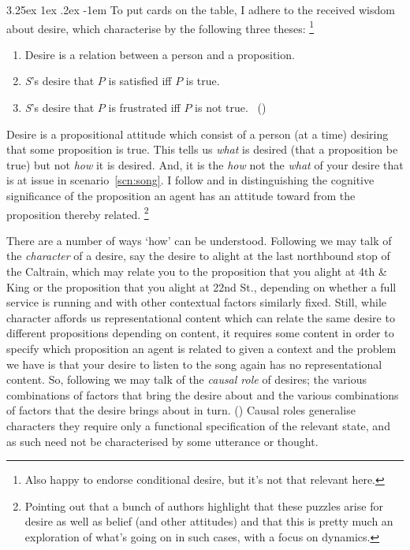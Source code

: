 \documentclass[10pt]{article}
\makeatletter
\renewcommand\paragraph{\@startsection{paragraph}{5}{\z@}%
  {3.25ex \@plus1ex \@minus.2ex}%
  {-1em}%
  {\normalfont\normalsize\bfseries}}
\makeatother
\begin{document}
\paragraph{ }
To put cards on the table, I adhere to the received wisdom about desire, which \citeauthor{McDaniel:2008aa} characterise by the following three theses:\nolinebreak
\footnote{\color{red} Also happy to endorse conditional desire, but it's not that relevant here.}
\begin{enumerate}[label=(RW\arabic*)]
\item Desire is a relation between a person and a proposition.
\item \emph{S}'s desire that \(P\) is satisfied iff \(P\) is true.
\item \emph{S}'s desire that \(P\) is frustrated iff \(P\) is not true.\nolinebreak
  \mbox{ }\hfill(\citeyear[269]{McDaniel:2008aa})
\end{enumerate}
Desire is a propositional attitude which consist of a person (at a time) desiring that some proposition is true.
This tells us \emph{what} is desired (that a proposition be true) but not \emph{how} it is desired.
And, it is the \emph{how} not the \emph{what} of your desire that is at issue in scenario~\ref{scn:song}.
I follow \citeauthor{Kaplan:1989ab} and \citeauthor{Perry:1993aa} in distinguishing the cognitive significance of the proposition an agent has an attitude toward from the proposition thereby related.\nolinebreak
\footnote{\color{red} Pointing out that a bunch of authors highlight that these puzzles arise for desire as well as belief (and other attitudes) and that this is pretty much an exploration of what's going on in such cases, with a focus on dynamics.}

There are a number of ways `how' can be understood.
Following \citeauthor{Kaplan:1989ab} we may talk of the \emph{character} of a desire, say the desire to alight at the last northbound stop of the Caltrain, which may relate you to the proposition that you alight at 4th \& King or the proposition that you alight at 22nd St., depending on whether a full service is running and with other contextual factors similarly fixed.
Still, while character affords us representational content which can relate the same desire to different propositions depending on content, it requires some content in order to specify which proposition an agent is related to given a context and the problem we have is that your desire to listen to the song again has no representational content.
So, following \citeauthor{Perry:1997aa} we may talk of the \emph{causal role} of desires; the various combinations of factors that bring the desire about and the various combinations of factors that the desire brings about in turn. (\citeyear[360--361]{Perry:1997aa})
Causal roles generalise characters they require only a functional specification of the relevant state, and as such need not be characterised by some utterance or thought.
\end{document}
